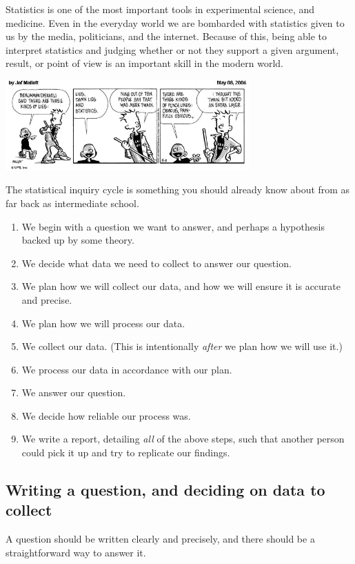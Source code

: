 



Statistics is one of the most important tools in experimental science, and medicine. Even in the everyday world we are
bombarded with statistics given to us by the media, politicians, and the internet. Because of this, being able to interpret
statistics and judging whether or not they support a given argument, result, or point of view is an important skill in
the modern world.

\begin{center}
  \includegraphics[width=0.7\textwidth]{stats}
\end{center}

The statistical inquiry cycle is something you should already know about from as far back as intermediate school.

\begin{enumerate}
  \item We begin with a question we want to answer, and perhaps a hypothesis backed up by some theory.
  \item We decide what data we need to collect to answer our question.
  \item We plan how we will collect our data, and how we will ensure it is accurate and precise.
  \item We plan how we will process our data.
  \item We collect our data. (This is intentionally \emph{after} we plan how we will use it.)
  \item We process our data in accordance with our plan.
  \item We answer our question.
  \item We decide how reliable our process was.
  \item We write a report, detailing \emph{all} of the above steps, such that another person
        could pick it up and try to replicate our findings.
\end{enumerate}

\subsection*{Writing a question, and deciding on data to collect}
A question should be written clearly and precisely, and there should be a straightforward way to answer it.

